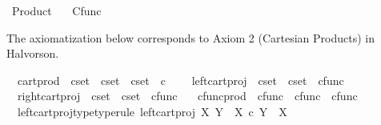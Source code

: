 %
\begin{isabellebody}%
%
%
\isadelimdocument
%
\endisadelimdocument
%
\isatagdocument
%
\isamarkuptrue%
%
\endisatagdocument
{\isafolddocument}%
%
\isadelimdocument
%
\endisadelimdocument
%
\isadelimtheory
%
\endisadelimtheory
%
\isatagtheory
{}\isamarkupfalse%
\ Product\isanewline
\ \ \ Cfunc\isanewline
{}%
\endisatagtheory
{\isafoldtheory}%
%
\isadelimtheory
%
\endisadelimtheory
%
\begin{isamarkuptext}%
The axiomatization below corresponds to Axiom 2 (Cartesian Products) in Halvorson.%
\end{isamarkuptext}\isamarkuptrue%
\isamarkupfalse%
\isanewline
\ \ cart{\isacharunderscore}{\kern0pt}prod\ {\isacharcolon}{\kern0pt}{\isacharcolon}{\kern0pt}\ {\isachardoublequoteopen}cset\ {\isasymRightarrow}\ cset\ {\isasymRightarrow}\ cset{\isachardoublequoteclose}\ {\isacharparenleft}{\kern0pt}\ {\isachardoublequoteopen}{\isasymtimes}\isactrlsub c{\isachardoublequoteclose}\ {}{}{\isacharparenright}{\kern0pt}\ \isanewline
\ \ left{\isacharunderscore}{\kern0pt}cart{\isacharunderscore}{\kern0pt}proj\ {\isacharcolon}{\kern0pt}{\isacharcolon}{\kern0pt}\ {\isachardoublequoteopen}cset\ {\isasymRightarrow}\ cset\ {\isasymRightarrow}\ cfunc{\isachardoublequoteclose}\ \isanewline
\ \ right{\isacharunderscore}{\kern0pt}cart{\isacharunderscore}{\kern0pt}proj\ {\isacharcolon}{\kern0pt}{\isacharcolon}{\kern0pt}\ {\isachardoublequoteopen}cset\ {\isasymRightarrow}\ cset\ {\isasymRightarrow}\ cfunc{\isachardoublequoteclose}\ \isanewline
\ \ cfunc{\isacharunderscore}{\kern0pt}prod\ {\isacharcolon}{\kern0pt}{\isacharcolon}{\kern0pt}\ {\isachardoublequoteopen}cfunc\ {\isasymRightarrow}\ cfunc\ {\isasymRightarrow}\ cfunc{\isachardoublequoteclose}\ {\isacharparenleft}{\kern0pt}{\isachardoublequoteopen}{\isasymlangle}{\isacharunderscore}{\kern0pt}{\isacharcomma}{\kern0pt}{\isacharunderscore}{\kern0pt}{\isasymrangle}{\isachardoublequoteclose}{\isacharparenright}{\kern0pt}\isanewline
{}\isanewline
\ \ left{\isacharunderscore}{\kern0pt}cart{\isacharunderscore}{\kern0pt}proj{\isacharunderscore}{\kern0pt}type{\isacharbrackleft}{\kern0pt}type{\isacharunderscore}{\kern0pt}rule{\isacharbrackright}{\kern0pt}{\isacharcolon}{\kern0pt}\ {\isachardoublequoteopen}left{\isacharunderscore}{\kern0pt}cart{\isacharunderscore}{\kern0pt}proj\ X\ Y\ {\isacharcolon}{\kern0pt}\ X\ {\isasymtimes}\isactrlsub c\ Y\ {\isasymrightarrow}\ X{\isachardoublequoteclose}\ \isanewline

\end{isabellebody}
